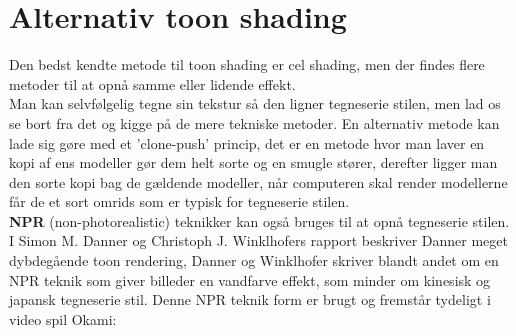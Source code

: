 \newpage
\section{Alternativ toon shading}
Den bedst kendte metode til toon shading er cel shading, men der findes flere metoder til at opnå samme eller lidende effekt.\\
Man kan selvfølgelig tegne sin tekstur så den ligner tegneserie stilen, men lad os se bort fra det og kigge på de mere tekniske metoder. En alternativ metode kan lade sig gøre med et ’clone-push’ princip,\cite{clone-push} det er en metode hvor man laver en kopi af ens modeller gør dem helt sorte og en smugle stører, derefter ligger man den sorte kopi bag de gældende modeller, når computeren skal render modellerne får de et sort omrids som er typisk for tegneserie stilen.\\

\textbf{NPR} (non-photorealistic) teknikker kan også bruges til at opnå tegneserie stilen. I Simon M. Danner og Christoph J. Winklhofers rapport\cite{npr} beskriver Danner meget dybdegående toon rendering, Danner og Winklhofer skriver blandt andet om en NPR teknik som giver billeder en vandfarve effekt, som minder om kinesisk og japansk tegneserie stil. Denne NPR teknik form er brugt og fremstår tydeligt i video spil Okami:
